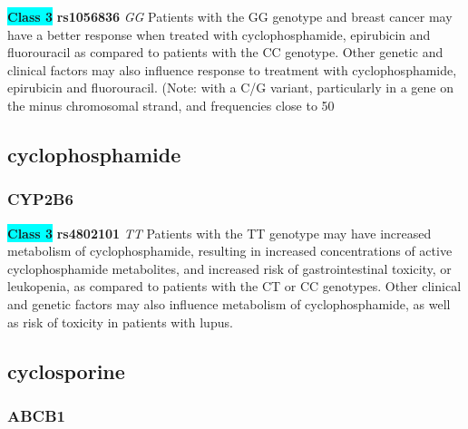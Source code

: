 \documentclass{book}
\begin{document}
\begin{center}
\textbf{\colorbox{cyan} {Class 3}} \textbf{ rs1056836 } \textit{ GG }
Patients with the GG genotype and breast cancer may have a better response when treated with cyclophosphamide, epirubicin and fluorouracil as compared to patients with the CC genotype. Other genetic and clinical factors may also influence response to treatment with cyclophosphamide, epirubicin and fluorouracil.  (Note: with a C/G variant, particularly in a gene on the minus chromosomal strand, and frequencies close to 50%


\end{center}\subsection{ cyclophosphamide }


\subsubsection{ CYP2B6 }

\begin{center}
\textbf{\colorbox{cyan} {Class 3}} \textbf{ rs4802101 } \textit{ TT }
Patients with the TT genotype may have increased metabolism of cyclophosphamide, resulting in increased concentrations of active cyclophosphamide metabolites, and increased risk of gastrointestinal toxicity, or leukopenia, as compared to patients with the CT or CC genotypes. Other clinical and genetic factors may also influence metabolism of cyclophosphamide, as well as risk of toxicity in patients with lupus.


\end{center}\subsection{ cyclosporine }


\subsubsection{ ABCB1 }
\end{document}
